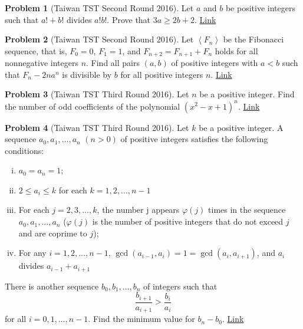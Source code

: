 \documentclass[]{article}
\theoremstyle{definition}
\newtheorem{problem}{Problem}
\begin{document}
\begin{problem}[Taiwan TST Second Round 2016]
	Let $a$ and $b$ be positive integers such that $a! + b!$ divides $a!b!$. Prove that $3a \ge 2b + 2$. \hfill \href{http://artofproblemsolving.com/community/c6h1268852p6622214}{Link}
\end{problem}



\begin{problem}[Taiwan TST Second Round 2016]
	Let $\left< F_n\right>$ be the Fibonacci sequence, that is, $F_0=0$, $F_1=1$, and $F_{n+2}=F_{n+1}+F_{n}$ holds for all nonnegative integers $n$.
	Find all pairs $(a,b)$ of positive integers with $a < b$ such that $F_n-2na^n$ is divisible by $b$ for all positive integers $n$. \hfill \href{http://artofproblemsolving.com/community/c6h1274121p6672411}{Link}
\end{problem}



\begin{problem}[Taiwan TST Third Round 2016]
	Let $n$ be a positive integer. Find the number of odd coefficients of the polynomial $(x^2-x+1)^n$. \hfill \href{http://artofproblemsolving.com/community/c6h1275931p6691592}{Link}
\end{problem}



\begin{problem}[Taiwan TST Third Round 2016]
	Let $k$ be a positive integer. A sequence $a_0, a_1, \dots, a_n$ $(n>0)$ of positive integers satisfies the following conditions:
	\begin{enumerate}[(i)]
		\item $a_0=a_n=1$;
		\item $2\leq a_i\leq k$ for each $k=1,2,\dots,n-1$
		\item For each $j=2,3,\dots,k$, the number j appears $\varphi (j)$ times in the sequence $a_0,a_1,\dots,a_n$ ($\varphi (j)$ is the number of positive integers that do not exceed $j$ and are coprime to $j$);
		\item For any $i=1,2,\dots,n-1$, $\gcd(a_{i-1},a_i)=1=\gcd(a_i,a_{i+1})$, and $a_i$ divides $a_{i-1}+a_{i+1}$
	\end{enumerate}
	There is another sequence $b_0,b_1,\dots,b_n$ of integers such that $$\frac{b_{i+1}}{a_{i+1}}>\frac{b_i}{a_i}$$ for all $i=0,1,\dots,n-1$. Find the minimum value for $b_n-b_0$. \hfill \href{http://www.artofproblemsolving.com/community/c6h1232316p6236640}{Link}
\end{problem}
\end{document}
